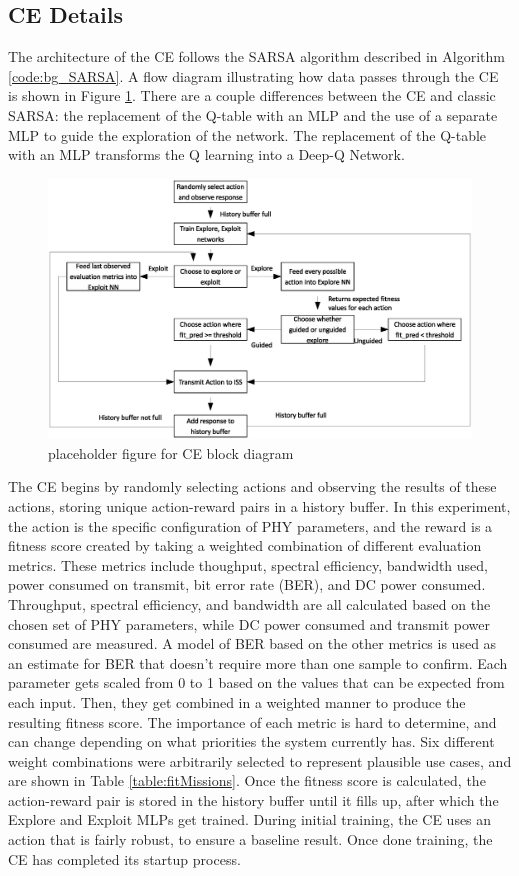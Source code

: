 \subsection{CE Details}
\par The architecture of the CE follows the SARSA algorithm described in Algorithm \ref{code:bg_SARSA}. A flow diagram illustrating how data passes through the CE is shown in Figure \ref{fig:ceDataFlow}. There are a couple differences between the CE and classic SARSA: the replacement of the Q-table with an MLP and the use of a separate MLP to guide the exploration of the network. The replacement of the Q-table with an MLP transforms the Q learning into a Deep-Q Network.
\begin{figure}[ht]
\includegraphics[width=\textwidth]{figures/rough_flow_diagram.eps}
\caption{placeholder figure for CE block diagram}\label{fig:ceDataFlow}
\end{figure}
\par The CE begins by randomly selecting actions and observing the results of these actions, storing unique action-reward pairs in a history buffer. In this experiment, the action is the specific configuration of PHY parameters, and the reward is a fitness score created by taking a weighted combination of different evaluation metrics. These metrics include thoughput, spectral efficiency, bandwidth used, power consumed on transmit, bit error rate (BER), and DC power consumed. Throughput, spectral efficiency, and bandwidth are all calculated based on the chosen set of PHY parameters, while DC power consumed and transmit power consumed are measured. A model of BER based on the other metrics is used as an estimate for BER that doesn't require more than one sample to confirm. Each parameter gets scaled from 0 to 1 based on the values that can be expected from each input. Then, they get combined in a weighted manner to produce the resulting fitness score. The importance of each metric is hard to determine, and can change depending on what priorities the system currently has. Six different weight combinations were arbitrarily selected to represent plausible use cases, and are shown in Table \ref{table:fitMissions}. Once the fitness score is calculated, the action-reward pair is stored in the history buffer until it fills up, after which the Explore and Exploit MLPs get trained. During initial training, the CE uses an action that is fairly robust, to ensure a baseline result. Once done training, the CE has completed its startup process.
